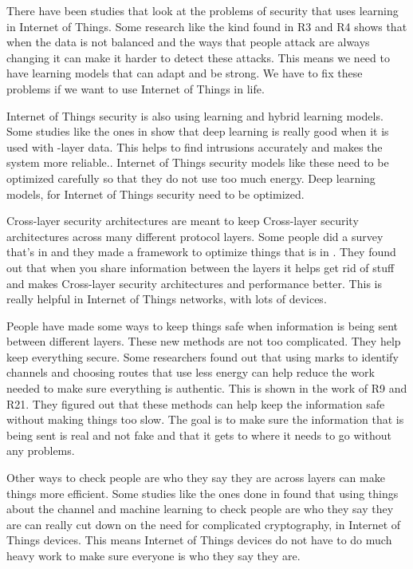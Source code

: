 \documentclass[a4paper,fleqn]{cas-dc}
\numberwithin{equation}{section}
\begin{document}
There have been studies that look at the problems of security that uses learning in Internet of Things. Some research like the kind found in R3 and R4 shows that when the data is not balanced and the ways that people attack are always changing it can make it harder to detect these attacks. This means we need to have learning models that can adapt and be strong. We have to fix these problems if we want to use Internet of Things in life.

Internet of Things security is also using learning and hybrid learning models. Some studies like the ones in \cite{liu2024auth} show that deep learning is really good when it is used with -layer data. This helps to find intrusions accurately and makes the system more reliable.. Internet of Things security models like these need to be optimized carefully so that they do not use too much energy. Deep learning models, for Internet of Things security need to be optimized.

Cross-layer security architectures are meant to keep Cross-layer security architectures across many different protocol layers. Some people did a survey that's in \cite{sreevidya2024trust} and they made a framework to optimize things that is in \cite{khair2024crosslayer}. They found out that when you share information between the layers it helps get rid of stuff and makes Cross-layer security architectures and performance better. This is really helpful in Internet of Things networks, with lots of devices.

People have made some ways to keep things safe when information is being sent between different layers. These new methods are not too complicated. They help keep everything secure. Some researchers found out that using marks to identify channels and choosing routes that use less energy can help reduce the work needed to make sure everything is authentic. This is shown in the work of R9 and R21. They figured out that these methods can help keep the information safe without making things too slow. The goal is to make sure the information that is being sent is real and not fake and that it gets to where it needs to go without any problems.

Other ways to check people are who they say they are across layers can make things more efficient. Some studies like the ones done in \cite{xiao2024multipath} found that using things about the channel and machine learning to check people are who they say they are can really cut down on the need for complicated cryptography, in Internet of Things devices. This means Internet of Things devices do not have to do much heavy work to make sure everyone is who they say they are.
\end{document}
